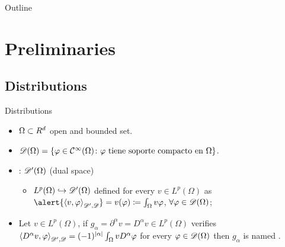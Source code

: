 
\begin{frame}[t,plain]
\titlepage
\end{frame}

\begin{frame}{Outline}
	\tableofcontents
\end{frame}

\section{Preliminaries}

\subsection{Distributions}

\begin{frame}{Distributions}

\begin{itemize}\itemsep1em
	\item $\Omega\subset\relax R^d$ open and bounded set.
	\item $\mathscr{D}(\Omega)=\{\varphi\in\mathcal{C}^\infty(\Omega)\colon\varphi\text{ tiene soporte compacto en }\Omega\}$. 
	
	\item {}: $\mathscr{D}'(\Omega)$ (dual space)
	\begin{itemize}\itemsep1em
		\item $L^p(\Omega)\hookrightarrow\mathscr{D} '(\Omega)$ defined for every $v\in L^p(\Omega)$ as $\alert{\dualD{v}{\varphi}}=v(\varphi)\coloneqq\int_\Omega v \varphi$, $\forall \varphi\in\mathscr{D}(\Omega)$;
	\end{itemize}

	\item Let $v\in L^p(\Omega)$, if $g_\alpha=\partial^\alpha v=D^\alpha v\in L^p(\Omega)$ verifies ${\langle D^\alpha v, \varphi \rangle}_{\mathscr{D'},\mathscr{D}}=(-1)^{\left|\alpha\right|}\int_\Omega v D^\alpha \varphi$ for every $\varphi\in\mathscr{D}(\Omega)$ then $g_\alpha$ is named .

\end{itemize}
\end{frame}

